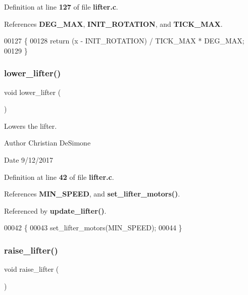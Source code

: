 Definition at line \textbf{ 127} of file \textbf{ lifter.\+c}.



References \textbf{ D\+E\+G\+\_\+\+M\+AX}, \textbf{ I\+N\+I\+T\+\_\+\+R\+O\+T\+A\+T\+I\+ON}, and \textbf{ T\+I\+C\+K\+\_\+\+M\+AX}.


\begin{DoxyCode}
00127                                         \{
00128   \textcolor{keywordflow}{return} (x - INIT_ROTATION) / TICK_MAX * DEG_MAX;
00129 \}
\end{DoxyCode}
\mbox{\label{lifter_8c_aa7d2d04059f57cc5b8582f6fd0726dc1}} 
\subsubsection{lower\+\_\+lifter()}
{\footnotesize\ttfamily void lower\+\_\+lifter (\begin{DoxyParamCaption}{ }\end{DoxyParamCaption})}



Lowers the lifter. 

\begin{DoxyAuthor}{Author}
Christian De\+Simone 
\end{DoxyAuthor}
\begin{DoxyDate}{Date}
9/12/2017 
\end{DoxyDate}


Definition at line \textbf{ 42} of file \textbf{ lifter.\+c}.



References \textbf{ M\+I\+N\+\_\+\+S\+P\+E\+ED}, and \textbf{ set\+\_\+lifter\+\_\+motors()}.



Referenced by \textbf{ update\+\_\+lifter()}.


\begin{DoxyCode}
00042                    \{
00043   set_lifter_motors(MIN_SPEED);
00044 \}
\end{DoxyCode}
\mbox{\label{lifter_8c_a7452163ed7946b6262f41de51c62dfd4}} 
\subsubsection{raise\+\_\+lifter()}
{\footnotesize\ttfamily void raise\+\_\+lifter (\begin{DoxyParamCaption}{ }\end{DoxyParamCaption})}




